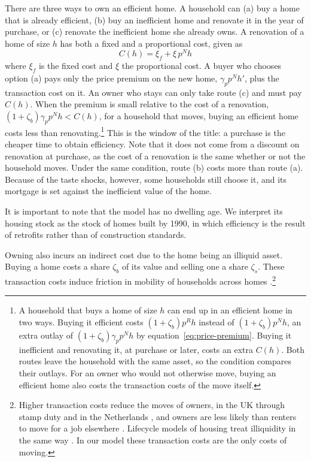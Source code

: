 There are three ways to own an efficient home. A household can (a) buy a home that is already efficient, (b) buy an inefficient home and renovate it in the year of purchase, or (c) renovate the inefficient home she already owns. A renovation of a home of size $h$ has both a fixed and a proportional cost, given as
\begin{equation}
  C(h)=\xi_f+\xi\,p^N h
  \label{eq:renovation-cost}
\end{equation}
where $\xi_f$ is the fixed cost and $\xi$ the proportional cost.
A buyer who chooses option (a) pays only the
price premium on the new home, $\gamma_p p^N h'$, plus the transaction cost
on it. An owner who stays can only take route (c) and must pay $C(h)$.
When the premium is small relative to the cost of a renovation,
$(1+\zeta_b)\gamma_p p^N h<C(h)$, for a household that moves, buying an
efficient home costs less than renovating.\footnote{A
household that buys a home of size $h$ can end up in an efficient home in
two ways. Buying it efficient costs $(1+\zeta_b)p^Rh$ instead of
$(1+\zeta_b)p^Nh$, an extra outlay of $(1+\zeta_b)\gamma_pp^Nh$ by
equation~\eqref{eq:price-premium}. Buying it inefficient and renovating it,
at purchase or later, costs an extra $C(h)$. Both routes leave the
household with the same asset, so the condition compares their outlays.
For an owner who would not otherwise move, buying an efficient home also
  costs the transaction costs of the move itself.} This is the window of the title: a purchase is the cheaper time to obtain efficiency. Note that it does not come from a discount on renovation at purchase, as the cost of a renovation is the same whether or not the household moves. Under the same condition, route (b)
costs more than route (a). Because of the taste shocks, however, some
households still choose it, and its mortgage is set against the inefficient
value of the home.

It is important to note that the model has no dwelling age. We interpret its housing stock as the stock of homes built by 1990, in which efficiency is the result of retrofits rather than of construction standards.


Owning also incurs an indirect cost due to the home being an illiquid asset. Buying a home costs a share $\zeta_b$ of its value and selling one a share $\zeta_s$.  These transaction costs induce friction in mobility of households across homes \citep{grossman1990asset}.\footnote{Higher transaction
costs reduce the moves of owners, in the UK through stamp duty
\citep{hilber2017transfer} and in the Netherlands
\citep{vanommeren2005new}, and owners are less likely than renters to move
for a job elsewhere \citep{battu2008housing,head2012housing}. Lifecycle
models of housing treat illiquidity in the same way
\citep{attanasio2012modelling,bajari2013dynamic,kaplan2020housing}. In our model these
transaction costs are the only costs of moving.}

